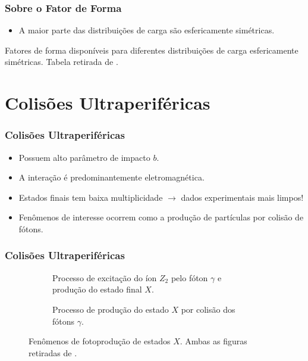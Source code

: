 \documentclass[xcolor=dvipsnames]{beamer}
\begin{document}
\begin{frame}
	\frametitle{Sobre o Fator de Forma}
	\begin{itemize}
		\item A maior parte das distribuições de carga são esfericamente
			simétricas.
	\end{itemize}
	{\footnotesize \renewcommand{\arraystretch}{3}
	\begin{table}
		
		\caption{Fatores de forma disponíveis para diferentes distribuições de
		carga esfericamente simétricas. Tabela retirada de \cite{povh6ed}.}
	\end{table}
	}
\end{frame}


\section{Colisões Ultraperiféricas}
\begin{frame}
	\frametitle{Colisões Ultraperiféricas}
	\begin{itemize}
		\item Possuem alto parâmetro de impacto $b$.
		\item A interação é predominantemente eletromagnética.
		\item Estados finais tem baixa multiplicidade $\rightarrow$ dados
			experimentais mais limpos!
		\item Fenômenos de interesse ocorrem como a produção de partículas por
			colisão de fótons.
	\end{itemize}
\end{frame}

\begin{frame}
	\frametitle{Colisões Ultraperiféricas}
	\begin{figure}
		\begin{subfigure}[b]{0.45\textwidth}
			\centering
			
			\caption{Processo de excitação do íon $Z_2$ pelo fóton $\gamma$ e
			produção do estado final $X$.}
		\end{subfigure}
		\hspace{0.25cm}
		\begin{subfigure}[b]{0.45\textwidth}
			\centering
			
			\caption{Processo de produção do estado $X$ por colisão dos fótons
			$\gamma$.}
		\end{subfigure}
		\caption{Fenômenos de fotoprodução de estados $X$. Ambas as figuras retiradas
		de \cite{bertulani2005}.}
	\end{figure}
\end{frame}
\end{document}
